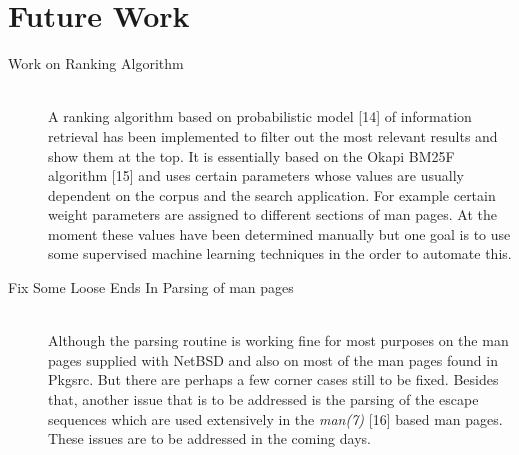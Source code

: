 \documentclass[titlepage, a4paper, 12pt]{article}
\begin{document}
\section{Future Work}
\begin{description}
\item[Work on Ranking Algorithm] \hfill \\
A ranking algorithm based on probabilistic model [14] of information
retrieval has been implemented to filter out the most relevant results and show
them at the top. It is essentially based on the Okapi BM25F algorithm [15] and
uses certain parameters whose values are usually dependent on the corpus and the
search application. For example certain weight parameters are assigned to
different sections of man pages. At the moment these values have been determined
manually but one goal is to use some supervised machine learning techniques in
the order to automate this.
\end{description}
\begin{description}
\item[Fix Some Loose Ends In Parsing of man pages] \hfill \\
Although the parsing routine is working fine for most purposes on the man pages
supplied with NetBSD and also on most of the man pages found in Pkgsrc. But there
are perhaps a few corner cases still to be fixed. Besides that, another issue
that
is to be addressed is the parsing of the escape sequences which are used
extensively in the \textit{man(7)} [16] based man pages. These issues are to be
addressed in the coming days.
\end{description}
\end{document}
